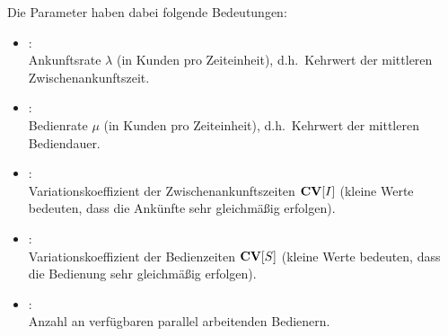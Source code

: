 Die Parameter haben dabei folgende Bedeutungen:
\begin{itemize}
\item
{}:\\
Ankunftsrate $\lambda$ (in Kunden pro Zeiteinheit), d.h.\ Kehrwert der mittleren Zwischenankunftszeit.
\item
{}:\\
Bedienrate $\mu$ (in Kunden pro Zeiteinheit), d.h.\ Kehrwert der mittleren Bediendauer.
\item
{}:\\
Variationskoeffizient der Zwischenankunftszeiten ${\bf CV}[I]$ (kleine Werte bedeuten, dass die Ankünfte sehr gleichmäßig erfolgen).
\item
{}:\\
Variationskoeffizient der Bedienzeiten ${\bf CV}[S]$ (kleine Werte bedeuten, dass die Bedienung sehr gleichmäßig erfolgen).
\item
{}:\\
Anzahl an verfügbaren parallel arbeitenden Bedienern.
\end{itemize}